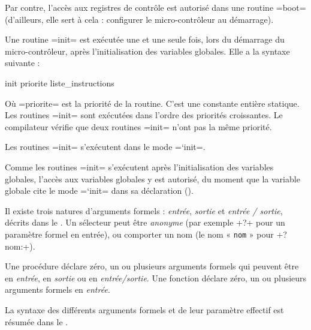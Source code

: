Par contre, l'accès aux registres de contrôle est autorisé dans une routine \plm=boot= (d'ailleurs, elle sert à cela : configurer le micro-contrôleur au démarrage).








Une routine \plm=init= est exécutée une et une seule fois, lors du démarrage du micro-contrôleur, après l'initialisation des variables globales. Elle a la syntaxe suivante :
\begin{PLM}
init priorite {
  liste_instructions
}
\end{PLM}
Où \plm=priorite= est la priorité de la routine. C'est une constante entière statique. Les routines \plm=init= sont exécutées dans l'ordre des priorités croissantes. Le compilateur vérifie que deux routines \plm=init= n'ont pas la même priorité.

Les routines \plm=init= s'exécutent dans le mode \plm=`init=.

Comme les routines \plm=init= s'exécutent après l'initialisation des variables globales, l'accès aux variables globales y est autorisé, du moment que la variable globale cite le mode \plm=`init= dans sa déclaration ().







Il existe trois natures d'arguments formels : \emph{entrée}, \emph{sortie} et \emph{entrée / sortie}, décrits dans le . Un sélecteur peut être \emph{anonyme} (par exemple \plm+?+ pour un paramètre formel en entrée), ou comporter un nom (le nom « \texttt{nom} » pour \plm+?nom:+).

Une procédure déclare zéro, un ou plusieurs arguments formels qui peuvent être en \emph{entrée}, en \emph{sortie} ou en \emph{entrée/sortie}. Une fonction déclare zéro, un ou plusieurs arguments formels en \emph{entrée}.

La syntaxe des différents arguments formels et de leur paramètre effectif est résumée dans le . 

